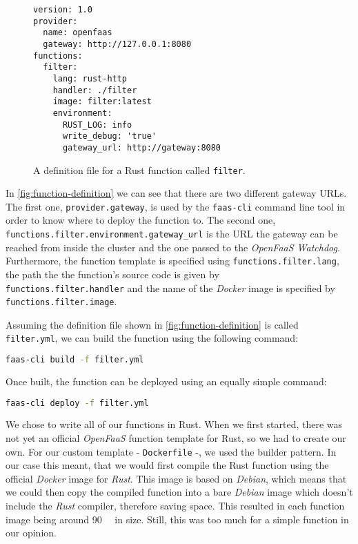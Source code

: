 \begin{figure}[H]
  \centering
  \begin{lstlisting}
version: 1.0
provider:
  name: openfaas
  gateway: http://127.0.0.1:8080
functions:
  filter:
    lang: rust-http
    handler: ./filter
    image: filter:latest
    environment:
      RUST_LOG: info
      write_debug: 'true'
      gateway_url: http://gateway:8080
  \end{lstlisting}
  \caption{A definition file for a Rust function called \texttt{filter}.}
  \label{fig:function-definition}
\end{figure}

In \autoref{fig:function-definition} we can see that there are two different gateway URLs. The first
one, \texttt{provider.gateway}, is used by the \texttt{faas-cli} command line tool in order to know
where to deploy the function to. The second one, \texttt{functions.filter.environment.gateway\_url}
is the URL the gateway can be reached from inside the cluster and the one passed to the
\textit{OpenFaaS Watchdog}. Furthermore, the function template is specified using
\texttt{functions.filter.lang}, the path the the function's source code is given by \\
\texttt{functions.filter.handler} and the name of the \textit{Docker} image is specified by \\
\texttt{functions.filter.image}.

Assuming the definition file shown in \autoref{fig:function-definition} is called
\texttt{filter.yml}, we can build the function using the following command:

\begin{lstlisting}[language=bash]
faas-cli build -f filter.yml
\end{lstlisting}

Once built, the function can be deployed using an equally simple command:

\begin{lstlisting}[language=bash]
faas-cli deploy -f filter.yml
\end{lstlisting}

We chose to write all of our functions in Rust. When we first started, there was not yet an official
\textit{OpenFaaS} function template for Rust, so we had to create our own. For our custom template -
\texttt{Dockerfile} -, we used the builder pattern. In our case this meant, that we would first
compile the Rust function using the official \textit{Docker} image for \textit{Rust}. This image is
based on \textit{Debian}, which means that we could then copy the compiled function into a bare
\textit{Debian} image which doesn't include the \textit{Rust} compiler, therefore saving space. This
resulted in each function image being around \SI{90}{\mega\byte} in size. Still, this was too much
for a simple function in our opinion.

